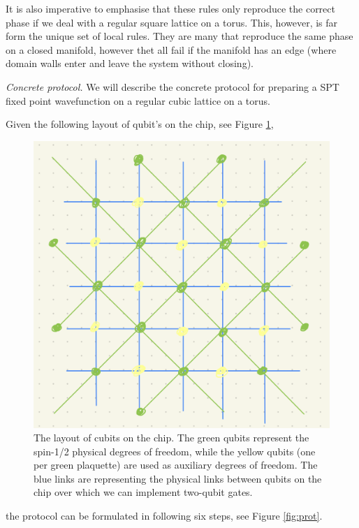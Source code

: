 \documentclass[a4paper,twocolumn,11pt]{quantumarticle}
\begin{document}
It is also imperative to emphasise that these rules only reproduce the correct phase if we deal with a regular square lattice on a torus.
This, however, is far form the unique set of local rules. They are many that reproduce the same phase on a closed manifold, however thet all fail if the manifold has an edge (where domain walls enter and leave the system without closing).

\emph{Concrete protocol.} We will describe the concrete protocol for preparing a SPT fixed point wavefunction on a regular cubic lattice on a torus. 

Given the following layout of qubit's on the chip, see Figure \ref{fig:chip},
\begin{figure}
\centering
\includegraphics[width=\linewidth]{Figures/on_chip.png}
\caption{The layout of cubits on the chip. The green qubits represent the spin-1/2 physical degrees of freedom, while the yellow qubits (one per green plaquette) are used as auxiliary degrees of freedom. The blue links are representing the physical links between qubits on the chip over which we can implement two-qubit gates.}
\label{fig:chip}
\end{figure}
the protocol can be formulated in following six steps, see Figure \ref{fig:prot}.
\end{document}
